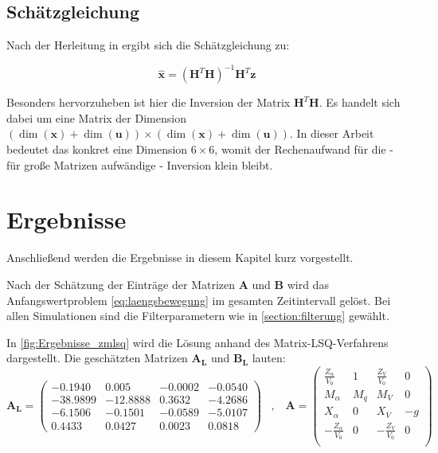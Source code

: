 \subsection{Schätzgleichung}

Nach der Herleitung in \cite{Mandry2021} ergibt sich die Schätzgleichung zu:

\begin{equation*}
    \hat{\mathbf{x}} = (\mathbf{H}^T \mathbf{H})^{-1}\mathbf{H}^T\mathbf{z}
\end{equation*}

Besonders hervorzuheben ist hier die Inversion der Matrix $\mathbf{H}^T \mathbf{H}$. Es handelt sich dabei um eine Matrix der 
Dimension $ (\dim{(\mathbf{x})}+\dim{(\mathbf{u})}) \times (\dim{(\mathbf{x})}+\dim{(\mathbf{u})}) $. In dieser Arbeit 
bedeutet das konkret eine Dimension $ 6 \times 6 $, womit der Rechenaufwand für 
die - für große Matrizen aufwändige - Inversion klein bleibt.
 
\section{Ergebnisse}
 
Anschließend werden die Ergebnisse in diesem Kapitel kurz vorgestellt.

Nach der Schätzung der Einträge der Matrizen $\mathbf{A}$ und $\mathbf{B}$ wird das Anfangswertproblem 
\eqref{eq:laengsbewegung} im gesamten Zeitintervall gelöst. Bei allen Simulationen sind die Filterparametern wie in 
\cref{section:filterung} gewählt.

In \cref{fig:Ergebnisse_zmlsq} wird die Lösung anhand des Matrix-LSQ-Verfahrens dargestellt. Die geschätzten Matrizen 
$\mathbf{A_L}$ und $\mathbf{B_L}$ lauten: 
\begin{equation}
 	\mathbf{A_L}\mathbf = \begin{pmatrix}
 		-0.1940 & 0.005 & -0.0002 & -0.0540 \\
 		-38.9899 & -12.8888 & 0.3632 & -4.2686 \\
 		-6.1506 & -0.1501 & -0.0589 & -5.0107 \\
 		0.4433 & 0.0427 & 0.0023 & 0.0818
 	\end{pmatrix} \;\;\; , \;\;\;
 	\mathbf{A} = \begin{pmatrix}
		\frac{Z_\alpha}{V_0} & 1 & \frac{Z_V}{V_0} & 0\\
		M_\alpha & M_q & M_V & 0\\
		X_\alpha & 0 & X_V & -g\\
		-\frac{Z_\alpha}{V_0} & 0 & -\frac{Z_V}{V_0} & 0\\
	\end{pmatrix}
	\nonumber
\end{equation}

